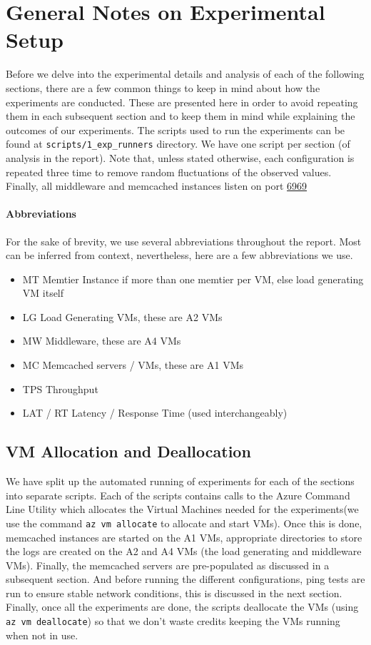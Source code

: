 \documentclass[11pt,a4paper]{article}
\begin{document}
\section{General Notes on Experimental Setup} \label{appendix_a}
Before we delve into the experimental details and analysis of each of the following sections, there are a few common things to keep in mind about how the experiments are conducted. These are presented here in order to avoid repeating them in each subsequent section and to keep them in mind while explaining the outcomes of our experiments. The scripts used to run the experiments can be found at \texttt{scripts/1\_exp\_runners} directory. We have one script per section (of analysis in the report). Note that, unless stated otherwise, each configuration is repeated three time to remove random fluctuations of the observed values. Finally, all middleware and memcached instances listen on port \underline{6969}

\paragraph{Abbreviations}
For the sake of brevity, we use several abbreviations throughout the report. Most can be inferred from context, nevertheless, here are a few abbreviations we use.
\begin{itemize}
	\setlength{\itemsep}{0pt}
	\setlength{\parskip}{0pt}
	\setlength{\parsep}{0pt}
	\item MT Memtier Instance if more than one memtier per VM, else load generating VM itself
	\item LG Load Generating VMs, these are A2 VMs
	\item MW Middleware, these are A4 VMs
	\item MC Memcached servers / VMs, these are A1 VMs
	\item TPS Throughput
	\item LAT / RT Latency / Response Time (used interchangeably)
\end{itemize}


\subsection{VM Allocation and Deallocation}
We have split up the automated running of experiments for each of the sections into separate scripts. Each of the scripts contains calls to the Azure Command Line Utility which allocates the Virtual Machines needed for the experiments(we use the command \texttt{az vm allocate} to allocate and start VMs). Once this is done, memcached instances are started on the A1 VMs, appropriate directories to store the logs are created on the A2 and A4 VMs (the load generating and middleware VMs). Finally, the memcached servers are pre-populated as discussed in a subsequent section. And before running the different configurations, ping tests are run to ensure stable network conditions, this is discussed in the next section. Finally, once all the experiments are done, the scripts deallocate the VMs (using \texttt{az vm deallocate}) so that we don't waste credits keeping the VMs running when not in use. 
\end{document}
